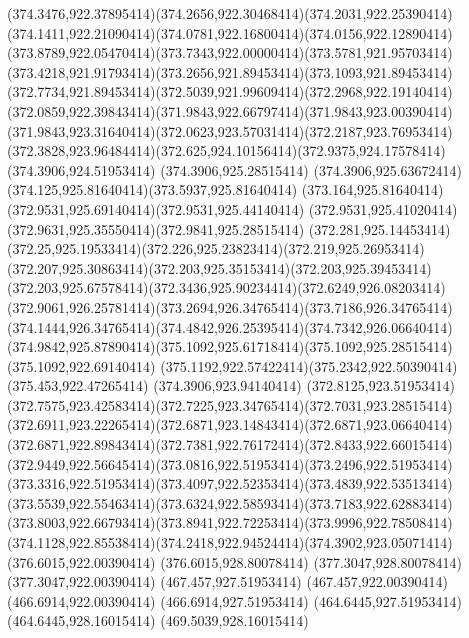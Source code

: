 {{	\curveto(374.3476,922.37895414)(374.2656,922.30468414)(374.2031,922.25390414)
	\curveto(374.1411,922.21090414)(374.0781,922.16800414)(374.0156,922.12890414)
	\curveto(373.8789,922.05470414)(373.7343,922.00000414)(373.5781,921.95703414)
	\curveto(373.4218,921.91793414)(373.2656,921.89453414)(373.1093,921.89453414)
	\curveto(372.7734,921.89453414)(372.5039,921.99609414)(372.2968,922.19140414)
	\curveto(372.0859,922.39843414)(371.9843,922.66797414)(371.9843,923.00390414)
	\curveto(371.9843,923.31640414)(372.0623,923.57031414)(372.2187,923.76953414)
	\curveto(372.3828,923.96484414)(372.625,924.10156414)(372.9375,924.17578414)
	\lineto(374.3906,924.51953414)
	\lineto(374.3906,925.28515414)
	\curveto(374.3906,925.63672414)(374.125,925.81640414)(373.5937,925.81640414)
	\curveto(373.164,925.81640414)(372.9531,925.69140414)(372.9531,925.44140414)
	\curveto(372.9531,925.41020414)(372.9631,925.35550414)(372.9841,925.28515414)
	\lineto(372.281,925.14453414)
	\curveto(372.25,925.19533414)(372.226,925.23823414)(372.219,925.26953414)
	\curveto(372.207,925.30863414)(372.203,925.35153414)(372.203,925.39453414)
	\curveto(372.203,925.67578414)(372.3436,925.90234414)(372.6249,926.08203414)
	\curveto(372.9061,926.25781414)(373.2694,926.34765414)(373.7186,926.34765414)
	\curveto(374.1444,926.34765414)(374.4842,926.25395414)(374.7342,926.06640414)
	\curveto(374.9842,925.87890414)(375.1092,925.61718414)(375.1092,925.28515414)
	\lineto(375.1092,922.69140414)
	\curveto(375.1192,922.57422414)(375.2342,922.50390414)(375.453,922.47265414)
	\closepath
	\moveto(374.3906,923.94140414)
	\lineto(372.8125,923.51953414)
	\curveto(372.7575,923.42583414)(372.7225,923.34765414)(372.7031,923.28515414)
	\curveto(372.6911,923.22265414)(372.6871,923.14843414)(372.6871,923.06640414)
	\curveto(372.6871,922.89843414)(372.7381,922.76172414)(372.8433,922.66015414)
	\curveto(372.9449,922.56645414)(373.0816,922.51953414)(373.2496,922.51953414)
	\curveto(373.3316,922.51953414)(373.4097,922.52353414)(373.4839,922.53513414)
	\curveto(373.5539,922.55463414)(373.6324,922.58593414)(373.7183,922.62883414)
	\curveto(373.8003,922.66793414)(373.8941,922.72253414)(373.9996,922.78508414)
	\curveto(374.1128,922.85538414)(374.2418,922.94524414)(374.3902,923.05071414)
	\closepath
	\moveto(376.6015,922.00390414)
	\lineto(376.6015,928.80078414)
	\lineto(377.3047,928.80078414)
	\lineto(377.3047,922.00390414)
	\closepath
	\moveto(467.457,927.51953414)
	\lineto(467.457,922.00390414)
	\lineto(466.6914,922.00390414)
	\lineto(466.6914,927.51953414)
	\lineto(464.6445,927.51953414)
	\lineto(464.6445,928.16015414)
	\lineto(469.5039,928.16015414)
}}
